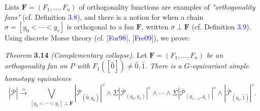 \documentclass{article}
\begin{document}
Lists \( \textbf{F} = (F_1, \ldots, F_n) \) of orthogonality functions are examples of \emph{"orthogonality fans"} (cf. Definition \textcolor{blue}{3.8}), and there is a notion for when a chain \( \sigma = [y_0 < \cdots < y_r] \) is orthogonal to a fan \( \textbf{F} \), written \( \sigma \perp \textbf{F} \) (cf. Definition \textcolor{blue}{3.9}). Using discrete Morse theory (cf. [\textcolor{blue}{For98}], [\textcolor{blue}{Fre09}]), we prove:

\emph{Theorem} \textbf{3.14} \emph{(Complementary collapse).}
Let \( \textbf{F} = (F_1, \ldots, F_n) \) \emph{be an orthogonality fan on \( P \) with \( F_1([\hat{0}]) \neq \hat{0}, \hat{1} \). There is a \( G \)-equivariant simple homotopy equivalence}
\[
|\overline{\mathcal{P}}|\xrightarrow{\simeq} \bigvee_{[y_0 < \cdots < y_r] \perp \textbf{F}} |\overline{\mathcal{P}}_{(\hat{0},y_0)}|^{\diamond} \wedge \Sigma|\overline{\mathcal{P}}_{(y_0,y_1)}|^{\diamond} \wedge \cdots \wedge \Sigma|\overline{\mathcal{P}}_{(y_{r-1},y_r)}|^{\diamond} \wedge |\overline{\mathcal{P}}_{(y_r,\hat{1})}|^{\diamond}.
\]
\end{document}
